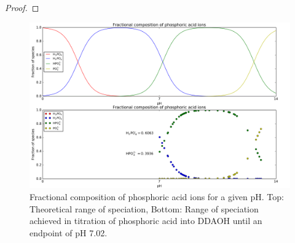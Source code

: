 \documentclass[a4paper,12pt,twocolumn]{article}
\begin{document}
\begin{proof}


	\end{proof}
	
	\pagebreak
	
	\begin{figure}[t!]
		\includegraphics[width=\linewidth]{phosfraction.png}
  		\caption{Fractional composition of phosphoric acid ions for a given pH. Top: Theoretical range of speciation, Bottom: Range of speciation achieved in titration of phosphoric acid into DDAOH until an endpoint of pH 7.02.}
  	\end{figure}
	 
	
\end{document}
